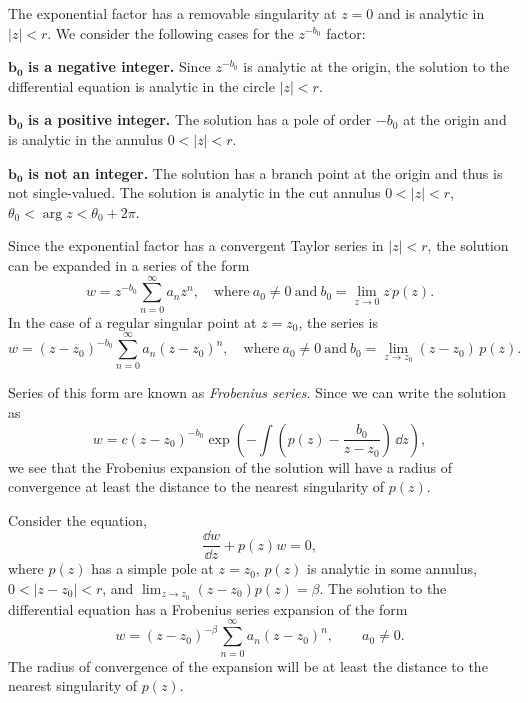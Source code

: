 The exponential factor has a removable singularity at $z = 0$ and is analytic 
in $|z| < r$.  We consider the following cases for the $z^{-b_0}$ factor:
\begin{description}
\item{$\mathbf{b_0}$ \textbf{is a negative integer.}}
  Since $z^{-b_0}$ is analytic at the origin, the solution to the differential
  equation is analytic in the circle $|z| < r$.
\item{$\mathbf{b_0}$ \textbf{is a positive integer.}}
  The solution has a pole of order $-b_0$ at the origin and is analytic
  in the annulus $0 < |z| < r$.
\item{$\mathbf{b_0}$ \textbf{is not an integer.}}
  The solution has a branch point at the origin and thus is not single-valued.
  The solution is analytic in the cut annulus $0 < |z| < r$, 
  $\theta_0 < \arg z < \theta_0 + 2\pi$.
\end{description}

Since the exponential factor has a convergent Taylor series in $|z|<r$,
the solution can be expanded in a series of the form
\[ 
w = z^{-b_0} \sum_{n=0}^\infty a_n z^n, 
\quad \mathrm{where}\ a_0 \neq 0\ 
\mathrm{and}\ b_0 = \lim_{z \to 0} z\,p(z).
\]
In the case of a regular singular point at $z = z_0$, the series is
\[ 
w = (z - z_0)^{-b_0} \sum_{n=0}^\infty a_n (z-z_0)^n, 
\quad \mathrm{where}\ a_0 \neq 0\ 
\mathrm{and}\ b_0 = \lim_{z \to z_0}(z-z_0)\,p(z).
\]


Series of this form are known as \textit{Frobenius series}. 
Since we can write the solution as
\[ 
w = c (z-z_0)^{-b_0} \exp \left(- \int 
  \left( p(z) - \frac{b_0}{z-z_0} \right) \,\dd z \right),
\]
we see that the Frobenius expansion of the solution will have a radius of 
convergence at least the distance to the nearest singularity of $p(z)$.




\begin{Result}
  Consider the equation,
  \[ 
  \frac{\dd w}{\dd z} + p(z) w = 0,
  \]
  where $p(z)$ has a simple pole at $z=z_0$, $p(z)$ is analytic in some
  annulus, $0 < |z-z_0| < r$, and $\lim_{z \to z_0} (z-z_0) p(z) = \beta$.
  The solution to the differential equation has a Frobenius series expansion
  of the form
  \[ 
  w = (z-z_0)^{-\beta} \sum_{n=0}^\infty a_n (z-z_0)^n, \qquad a_0 \neq 0.
  \]
  The radius of convergence of the expansion will be at least the 
  distance to the nearest singularity of $p(z)$.
\end{Result}








